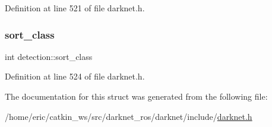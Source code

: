 Definition at line 521 of file darknet.\+h.

\mbox{\label{structdetection_a134b1d6d4fa5b3356af1e4af9d53f344}} 
\subsubsection{\texorpdfstring{sort\_class}{sort\_class}}
{\footnotesize\ttfamily int detection\+::sort\+\_\+class}



Definition at line 524 of file darknet.\+h.



The documentation for this struct was generated from the following file\+:\begin{DoxyCompactItemize}
\item 
/home/eric/catkin\+\_\+ws/src/darknet\+\_\+ros/darknet/include/\mbox{\hyperlink{darknet_8h}{darknet.\+h}}\end{DoxyCompactItemize}
